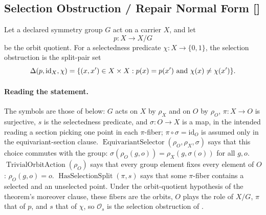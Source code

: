 \subsection{Selection Obstruction / Repair Normal Form [\texorpdfstring{}{F15a}]}\label{sec:symmetry:selection-obstruction}

\begin{definition}\label{def:selection-obstruction}
Let a declared symmetry group \(G\) act on a carrier \(X\), and let
\[
  p:X\to X/G
\]
be the orbit quotient.  For a selectedness predicate
\(\chi:X\to\{0,1\}\), the selection obstruction is the split-pair set
\[
  \Delta(p,\mathrm{id}_X,\chi) =
  \{(x,x')\in X\times X:
      p(x)=p(x')\ \text{and}\ \chi(x)\ne\chi(x')\}.
\]
\end{definition}

\paragraph{Reading the statement.}
The symbols are those of  below: \(G\) acts on \(X\)
by \(\rho_X\) and on \(O\) by \(\rho_O\), \(\pi:X\to O\) is
surjective, \(s\) is the selectedness predicate, and
\(\sigma:O\to X\) is a map, in the intended reading a section picking one point in each \(\pi\)-fiber; \(\pi\circ\sigma=\mathrm{id}_O\) is assumed only in the equivariant-section clause.
\(\operatorname{EquivariantSelector}(\rho_O,\rho_X,\sigma)\) says
that this choice commutes with the group:
\(\sigma(\rho_O(g,o))=\rho_X(g,\sigma(o))\) for all \(g,o\).
\(\operatorname{TrivialOrbitAction}(\rho_O)\) says that every group
element fixes every element of \(O\): \(\rho_O(g,o)=o\).
\(\operatorname{HasSelectionSplit}(\pi,s)\) says that some
\(\pi\)-fiber contains a selected and an unselected point.
Under the orbit-quotient hypothesis of the theorem's moreover
clause, these fibers are the orbits, \(O\) plays the role of \(X/G\),
\(\pi\) that of \(p\), and \(s\) that of \(\chi\), so
\(\mathcal O_s\) is the selection obstruction of
.


